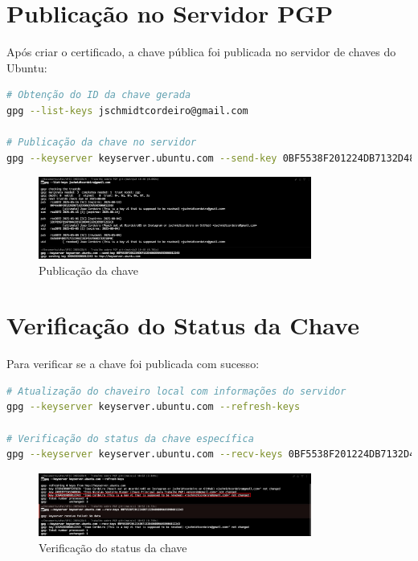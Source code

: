 \section{Publicação no Servidor PGP}
Após criar o certificado, a chave pública foi publicada no servidor de chaves do Ubuntu:

\begin{lstlisting}[language=bash]
# Obtenção do ID da chave gerada
gpg --list-keys jschmidtcordeiro@gmail.com

# Publicação da chave no servidor
gpg --keyserver keyserver.ubuntu.com --send-key 0BF5538F201224DB7132D486DD9A93D9B6812243
\end{lstlisting}

\begin{figure}[htb]
    \centering
    \includegraphics[width=0.8\textwidth]{images/02-publicacao_chave_pgp.jpeg}
    \caption{Publicação da chave}
    \label{fig:publicacao-chave}
\end{figure}

\section{Verificação do Status da Chave}
Para verificar se a chave foi publicada com sucesso:

\begin{lstlisting}[language=bash]
# Atualização do chaveiro local com informações do servidor
gpg --keyserver keyserver.ubuntu.com --refresh-keys

# Verificação do status da chave específica
gpg --keyserver keyserver.ubuntu.com --recv-keys 0BF5538F201224DB7132D486DD9A93D9B6812243
\end{lstlisting}

\begin{figure}[htb]
    \centering
    \includegraphics[width=0.8\textwidth]{images/02-verificacao_status_chave.jpeg}
    \caption{Verificação do status da chave}
    \label{fig:verificacao-status}
\end{figure}

